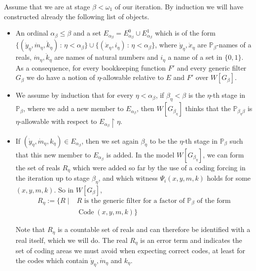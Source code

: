 \documentclass[a4paper,11pt]{article}
\newcommand{\forceP}{\mathbb{P}}
\begin{document}
Assume that we are at stage $\beta < \omega_1$ of our iteration.  By induction we will have constructed already the following list of objects.
\begin{itemize}

\item An ordinal $\alpha_{\beta} \le \beta$ and a set $E_{\alpha_{\beta}}= E^0_{\alpha_{\beta}} \cup E^1_{\alpha_{\beta}}$ which is of the form $\{(\dot{y}_{\eta}, \dot{m}_{\eta},\dot{k}_{\eta} ) \, : \, \eta < \alpha_{\beta} \} \cup \{ (\dot{x}_{\eta}, i_{\eta} ) \, : \, \eta < \alpha_{\beta} \}$, where $\dot{y}_{\eta},\dot{x}_{\eta} $ are $\forceP_{\beta}$-names of a reals, $\dot{m}_\eta, \dot{k}_{\eta}$ are names of natural numbers and $i_{\eta}$ a name of a set in $ \{0,1\}$. As a consequence, for every bookkeeping function $F'$ and every generic filter $G_{\beta}$ we do have a notion of $\eta$-allowable relative to $E$ and $F'$ over $W[G_{\beta}]$.


\item We assume by induction that for every $\eta < \alpha_{\beta}$, if $\beta_{\eta}< \beta$ is the $\eta$-th stage in $\forceP_{\beta}$, where we add a new member to $E_{\alpha_{\beta}}$, then $W[G_{\beta_{\eta}}]$ thinks that the $\forceP_{\beta_{\eta} \beta}$ is $\eta$-allowable with respect to $E_{\alpha_{\beta}} \upharpoonright \eta$.

\item If $( \dot{y}_{\eta},\dot{m}_{\eta},k_{\eta}) \in E_{\alpha_{\beta}}$, then we set again $\beta_{\eta}$ to be the $\eta$-th stage in $\forceP_{\beta}$ such that this new member to $E_{\alpha_{\beta}}$ is added. In the model $W[G_{\beta_{\eta}}]$, we can form the set of reals $R_{\eta}$ which were added so far by the use of a coding forcing in the iteration up to stage $\beta_{\eta}$, and  which witness $\Psi_i (x,y,m,k)$ holds for some $(x,y,m,k)$. 
So in $W[G_{\beta}]$, 
\begin{align*}
    R_{\eta}:= \{ R \mid & R \text{ is the generic filter for a factor of $\forceP_{\beta}$ of the form} 
    \\& \text{$\operatorname{Code} (x,y,m,k)$} \}
\end{align*}

Note that $R_{\eta}$ is a countable set of reals and can therefore be identified with a real itself, which we will do. The real $R_{\eta}$ is an error term and indicates the set of coding areas we must avoid when expecting correct codes, at least for the codes which contain $\dot{y}_{\eta},\dot{m}_{\eta}$ and $k_{\eta}$.

\end{itemize}
\end{document}
